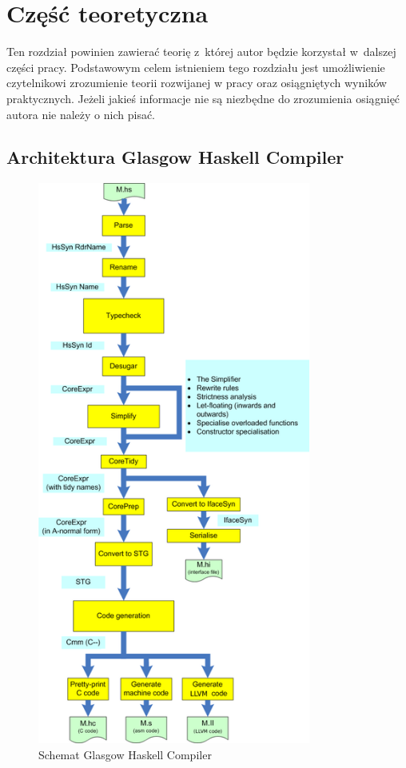 \chapter{Część teoretyczna}\label{chap:teoria}
Ten rozdział powinien zawierać teorię z~której autor będzie korzystał w~dalszej
części pracy.  Podstawowym celem istnieniem tego rozdziału jest umożliwienie
czytelnikowi zrozumienie teorii rozwijanej w pracy oraz osiągniętych wyników
praktycznych.  Jeżeli jakieś informacje nie są niezbędne do zrozumienia
osiągnięć autora nie należy o nich pisać.

\section{Architektura Glasgow Haskell Compiler}


\begin{figure}[ht]
    \centering
    \includegraphics[width=0.8\textwidth]{images/AOSA_compiler}
    \caption[Schemat Glasgow Haskell Compiler]{Schemat Glasgow Haskell Compiler\cite{AOSA}}
    \label{fig:AOSA_compiler}
\end{figure}


